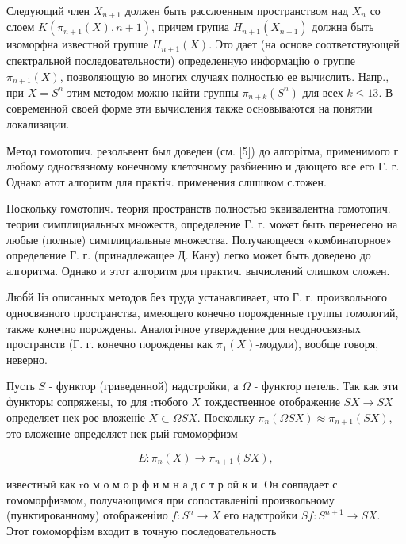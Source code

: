 \documentclass[10pt]{article}
\begin{document}
Следующий член $X_{n+1}$ должен быть расслоенным пространством над $X_{n}$ со слоем $K\left(\pi_{n+1}(X), n+1\right)$, причем групиа $H_{n+1}\left(X_{n+1}\right)$ должна быть изоморфна известной групше $H_{n+1}(X)$. Это дает (на основе соответствующей спектральной последовательности) определенную информацію о группе $\pi_{n+1}(X)$, позволяющую во многих случаях полностью ее вычислить. Напр., при $X=S^{n}$ этим методом можно найти группы $\pi_{n+k}\left(S^{n}\right)$ для всех $k \leqslant 13$. В современной своей форме эти вычисления также основываются на понятии локализации.



Метод гомотопич. резольвент был доведен (см. [5]) до алгорітма, применимого г любому односвязному конечному клеточному разбиению и дающего все его Г. г. Однако әтот алгоритм для практіч. применения слшшком с.тожен.



Поскольку гомотопич. теория пространств полностью эквивалентна гомотопич. теории симплициальных множеств, определение Г. г. может быть перенесено на любые (полные) симплициальные множества. Получающееся «комбинаторное» определение Г. г. (принадлежащее Д. Кану) легко может быть доведено до алгоритма. Однако и этот алгоритм для практич. вычислений слишком сложен.



Люб́й Ііз описанных методов без труда устанавливает, что Г. г. произвольного односвязного пространства, имеющего конечно порожденные группы гомологий, также конечно порождены. Аналогічное утверждение для неодносвязных пространств (Г. г. конечно порождены как $\pi_{1}(X)$-модули), вообще говоря, неверно.



Пусть $S$ - функтор (гриведенной) надстройки, а $\Omega$ - функтор петель. Так как эти функторы сопряжены, то для :тюбого $X$ тождественное отображение $S X \rightarrow S X$ определяет нек-рое вложеніе $X \subset \Omega S X$. Поскольку $\pi_{n}(\Omega S X) \approx \pi_{n+1}(S X)$, это вложение определяет нек-рый гомоморфизм



\[

E: \pi_{n}(X) \rightarrow \pi_{n+1}(S X),

\]



известный как $\mathrm{r} о$ м о м о р ф и м н а д с т р ой к и. Он совпадает с гомоморфизмом, получающимся при сопоставленіпі произвольному (пунктированному) отображеніио $f: S^{n} \rightarrow X$ его надстройки $S f: S^{n+1} \rightarrow S X$. Этот гомоморфізм входит в точную последовательность
\end{document}

